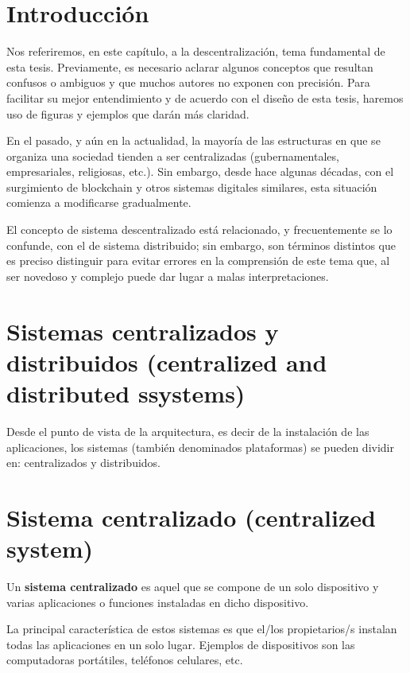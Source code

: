 \documentclass[12pt]{report} %
\begin{document}
\section{Introducción}

Nos referiremos, en este capítulo, a la descentralización, tema fundamental de esta tesis. Previamente, es necesario aclarar algunos conceptos que resultan confusos o ambiguos y que muchos autores no exponen con precisión. Para facilitar su mejor entendimiento y de acuerdo con el diseño de esta tesis, haremos uso de figuras y ejemplos que darán más claridad.

En el pasado, y aún en la actualidad, la mayoría de las estructuras en que se organiza una sociedad tienden a ser centralizadas (gubernamentales, empresariales, religiosas, etc.). Sin embargo, desde hace algunas décadas, con el surgimiento de blockchain y otros sistemas digitales similares, esta situación comienza a modificarse gradualmente.

El concepto de sistema descentralizado está relacionado, y frecuentemente se lo confunde, con el de sistema distribuido; sin embargo, son términos distintos que es preciso distinguir para evitar errores en la comprensión de este tema que, al ser novedoso y complejo puede dar lugar a malas interpretaciones.  

\section{Sistemas centralizados y distribuidos (centralized and distributed ssystems)} 
\label{Sistemas centralizados y distribuidos}

Desde el punto de vista de la arquitectura, es decir de la instalación de las aplicaciones, los sistemas (también denominados plataformas) se pueden dividir en: centralizados y distribuidos. 

\section{Sistema centralizado (centralized system)}

Un \textbf{sistema centralizado} es aquel que se compone de un solo dispositivo y varias aplicaciones o funciones instaladas en dicho dispositivo.

La principal característica de estos sistemas es que el/los propietarios/s instalan todas las aplicaciones en un solo lugar. Ejemplos de dispositivos son las computadoras portátiles, teléfonos celulares, etc.  
\end{document}
